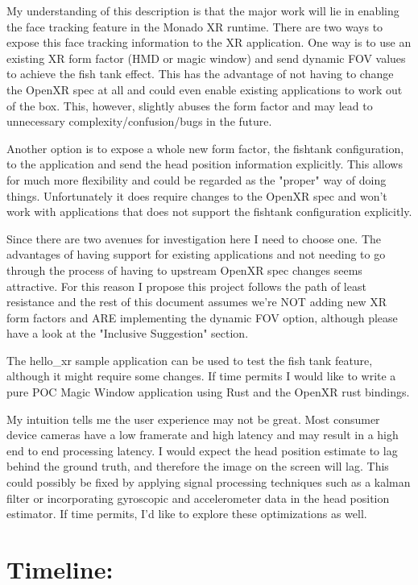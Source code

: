 \begin{normalsize}
\begin{quote}
\end{quote}

My understanding of this description is that the major work will lie in enabling
the face tracking feature in the Monado XR runtime. There are two ways to expose
this face tracking information to the XR application. One way is to use an
existing XR form factor (HMD or magic window) and send dynamic FOV values to
achieve the fish tank effect. This has the advantage of not having to change the
OpenXR spec at all and could even enable existing applications to work out of the
box. This, however, slightly abuses the form factor and may lead to unnecessary
complexity/confusion/bugs in the future.

Another option is to expose a whole new form factor, the fishtank configuration,
to the application and send the head position information explicitly. This allows
for much more flexibility and could be regarded as the "proper" way of doing
things.  Unfortunately it does require changes to the OpenXR spec and won't work
with applications that does not support the fishtank configuration explicitly.

Since there are two avenues for investigation here I need to choose one. The
advantages of having support for existing applications and not needing to go
through the process of having to upstream OpenXR spec changes seems attractive.
For this reason I propose this project follows the path of least resistance and
the rest of this document assumes we're NOT adding new XR form factors and ARE
implementing the dynamic FOV option, although please have a look at the "Inclusive
Suggestion" section.

The hello\_xr sample application can be used to test the fish tank feature,
although it might require some changes. If time permits I would like to write a
pure POC Magic Window application using Rust and the OpenXR rust bindings.

My intuition tells me the user experience may not be great. Most consumer device
cameras have a low framerate and high latency and may result in a high end to end
processing latency. I would expect the head position estimate to lag behind the
ground truth, and therefore the image on the screen will lag. This could possibly
be fixed by applying signal processing techniques such as a kalman filter or
incorporating gyroscopic and accelerometer data in the head position estimator. If
time permits, I'd like to explore these optimizations as well.

\section{Timeline:}


\end{normalsize}
